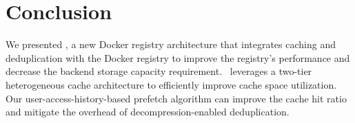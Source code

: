 \section{Conclusion}
\label{sec:conclusion}
We presented \sysname, a new Docker registry architecture that integrates caching and deduplication with the Docker registry 
to
improve the registry's performance and decrease the backend storage capacity requirement. 
\sysname~leverages a two-tier heterogeneous cache architecture to efficiently improve cache space 
utilization. Our user-access-history-based prefetch algorithm can improve the cache hit ratio and mitigate the overhead of decompression-enabled deduplication.
